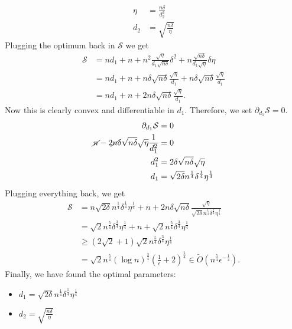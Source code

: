 \documentclass[11pt]{article}
\begin{document}
\begin{enumerate}
\begin{align*}
        \eta &= \frac{n\delta}{d_2^2}\\
        d_2 &= \sqrt{\frac{n\delta}{\eta}}
    \end{align*}
    Plugging the optimum back in $\mathcal{S}$ we get 
    \begin{align*}
        \mathcal{S} &= nd_1 + n + n^2\frac{\sqrt{\eta}}{d_1\sqrt{n\delta}}\delta ^2 + n\frac{\sqrt{n\delta}}{d_1\sqrt{\eta}}\delta \eta \\
        & = nd_1 + n + n\delta \sqrt{n\delta}\frac{\sqrt{\eta}}{d_1}+ n\delta\sqrt{n\delta} \frac{\sqrt{\eta}}{d_1}\\
        & = nd_1 + n + 2n\delta \sqrt{n\delta}\frac{\sqrt{\eta}}{d_1}.
    \end{align*}
    Now this is clearly convex and differentiable in $d_1$. Therefore, we set $\partial_{d_1}\mathcal{S} = 0$. 
    \begin{align*}
        \partial_{d_1}\mathcal{S} &= 0\\
        \cancel{n} - 2\cancel{n}\delta\sqrt{n\delta}\sqrt{\eta}\frac{1}{d_1^2} &= 0\\
        d_1^2 &= 2\delta \sqrt{n\delta}\sqrt{\eta} \\
        d_1 &= \sqrt{2\delta} n^{\frac{1}{4}}\delta^{\frac{1}{4}}\eta^{\frac{1}{4}}
    \end{align*}
    Plugging everything back, we get
    \begin{align*}
        \mathcal{S} &= n\sqrt{2\delta} n^{\frac{1}{4}}\delta^{\frac{1}{4}}\eta^{\frac{1}{4}} + n + 2n\delta \sqrt{n\delta}\frac{\sqrt{\eta}}{\sqrt{2\delta} n^{\frac{1}{4}}\delta^{\frac{1}{4}}\eta^{\frac{1}{4}}}\\
        &= \sqrt{2}n^{\frac{5}{4}}\delta^{\frac{3}{4}}\eta^{\frac{1}{4}} +n+ \sqrt{2}n^{\frac{5}{4}}\delta^{\frac{3}{4}}\eta^{\frac{1}{4}}\\
        & \geq (2\sqrt{2} + 1)\sqrt{2}n^{\frac{5}{4}}\delta^{\frac{3}{4}}\eta^{\frac{1}{4}} \\
        & = \sqrt{2}n^{\frac{5}{4}}\left(\log n\right)^{\frac{3}{4}}\left(\frac{1}{\epsilon}+2\right)^{\frac{1}{4}} \in \tilde O \left(n^{\frac{5}{4}}\epsilon^{-\frac{1}{4}}\right).
    \end{align*}
    Finally, we have found the optimal parameters:
    \begin{itemize}
        \item $d_1 = \sqrt{2\delta} n^{\frac{1}{4}}\delta^{\frac{1}{4}}\eta^{\frac{1}{4}}$
        \item $d_2 = \sqrt{\frac{n\delta}{\eta}}$

\end{itemize}
\end{enumerate}
\end{document}
